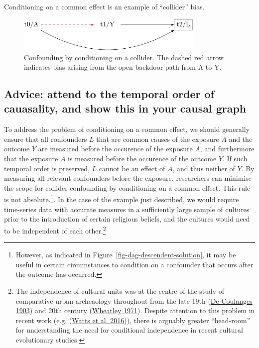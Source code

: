\documentclass[
  singlecolumn]{report}
\begin{document}
Conditioning on a common effect is an example of ``collider'' bias.

\begin{figure}

{\centering \includegraphics[width=0.8\textwidth,height=\textheight]{causal-dags_files/figure-pdf/fig-dag-common-effect-1.pdf}

}

\caption{\label{fig-dag-common-effect}Confounding by conditioning on a
collider. The dashed red arrow indicates bias arising from the open
backdoor path from A to Y.}

\end{figure}

\hypertarget{advice-attend-to-the-temporal-order-of-cauasality-and-show-this-in-your-causal-graph}{%
\subsection{Advice: attend to the temporal order of cauasality, and show
this in your causal
graph}\label{advice-attend-to-the-temporal-order-of-cauasality-and-show-this-in-your-causal-graph}}

To address the problem of conditioning on a common effect, we should
generally ensure that all confounders \(L\) that are common causes of
the exposure \(A\) and the outcome \(Y\) are measured before the
occurence of the exposure \(A\), and furthermore that the exposure \(A\)
is measured before the occurence of the outcome \(Y\). If such temporal
order is preserved, \(L\) cannot be an effect of \(A\), and thus neither
of \(Y\). By measuring all relevant confounders before the exposure,
researchers can minimise the scope for collider confounding by
conditioning on a common effect. This rule is not absolute.\footnote{However,
  as indicated in Figure~\ref{fig-dag-descendent-solution}, it may be
  useful in certain circumstances to condition on a confounder that
  occurs after the outcome has occurred.}. In the case of the example
just described, we would require time-series data with accurate measures
in a sufficiently large sample of cultures prior to the introduction of
certain religious beliefs, and the cultures would need to be independent
of each other.\footnote{The independence of cultural units was at the
  centre of the study of comparative urban archeaology throughout from
  the late 19th (\protect\hyperlink{ref-decoulanges1903}{De Coulanges
  1903}) and 20th century (\protect\hyperlink{ref-wheatley1971}{Wheatley
  1971}). Despite attention to this problem in recent work (e.g.
  (\protect\hyperlink{ref-watts2016}{Watts et al. 2016})), there is
  arguably greater ``head-room'' for understanding the need for
  conditional independence in recent cultural evolutionary studies.}
\end{document}
